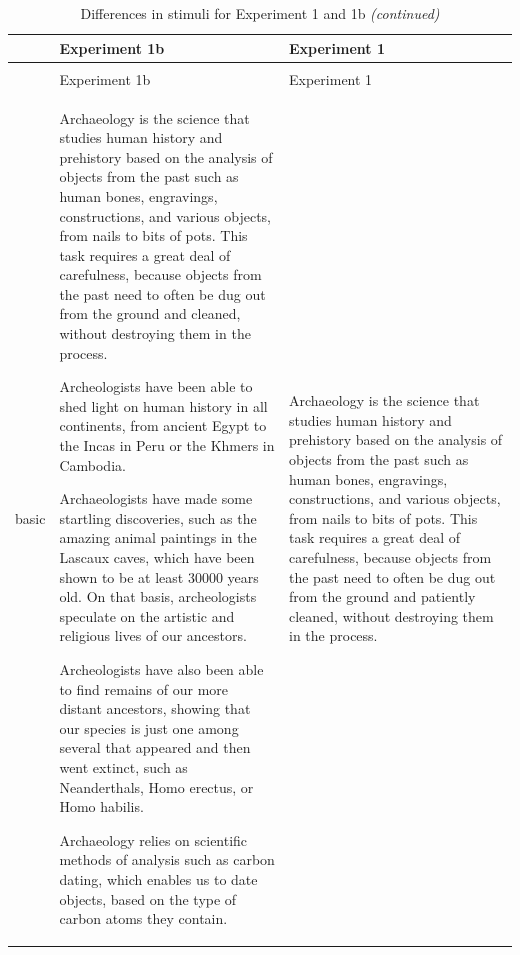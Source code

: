 \documentclass[
  english,
  doc,floatsintext]{apa6}
\begin{document}
\begingroup\fontsize{8}{10}\selectfont

\begin{longtable}[t]{>{\raggedright\arraybackslash}p{5em}>{\raggedright\arraybackslash}p{25em}>{\raggedright\arraybackslash}p{25em}}
\caption{\label{tab:exp1-exp1b-differences}Differences in stimuli for Experiment 1 and 1b}\\
\toprule
 & Experiment 1b & Experiment 1\\
\midrule
\endfirsthead
\caption[]{\label{tab:exp1-exp1b-differences}Differences in stimuli for Experiment 1 and 1b \textit{(continued)}}\\
\toprule
 & Experiment 1b & Experiment 1\\
\midrule
\endhead

\endfoot
\bottomrule
\endlastfoot
basic & Archaeology is the science that studies human history and prehistory based on the analysis of objects from the past such as human bones, engravings, constructions, and various objects, from nails to bits of pots. This task requires a great deal of carefulness, because objects from the past need to often be dug out from the ground and cleaned, without destroying them in the process. 

Archeologists have been able to shed light on human history in all continents, from ancient Egypt to the Incas in Peru or the Khmers in Cambodia. 

Archaeologists have made some startling discoveries, such as the amazing animal paintings in the Lascaux caves, which have been shown to be at least 30000 years old. On that basis, archeologists speculate on the artistic and religious lives of our ancestors. 

Archeologists have also been able to find remains of our more distant ancestors, showing that our species is just one among several that appeared and then went extinct, such as Neanderthals, Homo erectus, or Homo habilis. 

Archaeology relies on scientific methods of analysis such as carbon dating, which enables us to date objects, based on the type of carbon atoms they contain. & Archaeology is the science that studies human history and prehistory based on the analysis of objects from the past such as human bones, engravings, constructions, and various objects, from nails to bits of pots. This task requires a great deal of carefulness, because objects from the past need to often be dug out from the ground and patiently cleaned, without destroying them in the process.


\end{longtable}
\end{document}
